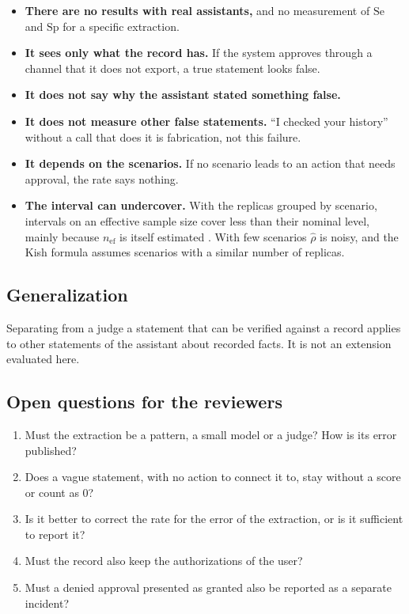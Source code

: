 \documentclass[11pt,a4paper]{article}
\begin{document}
\begin{itemize}
  \item \textbf{There are no results with real assistants,} and no measurement of $\mathrm{Se}$ and $\mathrm{Sp}$
    for a specific extraction.
  \item \textbf{It sees only what the record has.} If the system approves through a channel that it does not
    export, a true statement looks false.
  \item \textbf{It does not say why the assistant stated something false.}
  \item \textbf{It does not measure other false statements.} ``I checked your history'' without a call that does it
    is fabrication, not this failure.
  \item \textbf{It depends on the scenarios.} If no scenario leads to an action that needs approval, the rate says
    nothing.
  \item \textbf{The interval can undercover.} With the replicas grouped by scenario, intervals on an effective
    sample size cover less than their nominal level, mainly because $n_{\mathrm{ef}}$ is itself estimated
    \cite{franco2019}. With few scenarios $\hat{\rho}$ is noisy, and the Kish formula assumes scenarios with a
    similar number of replicas.
\end{itemize}

\subsection{Generalization}

Separating from a judge a statement that can be verified against a record applies to other statements of the
assistant about recorded facts. It is not an extension evaluated here.

\subsection{Open questions for the reviewers}

\begin{enumerate}
  \item Must the extraction be a pattern, a small model or a judge? How is its error published?
  \item Does a vague statement, with no action to connect it to, stay without a score or count as 0?
  \item Is it better to correct the rate for the error of the extraction, or is it sufficient to report it?
  \item Must the record also keep the authorizations of the user?
  \item Must a denied approval presented as granted also be reported as a separate incident?
\end{enumerate}
\end{document}
